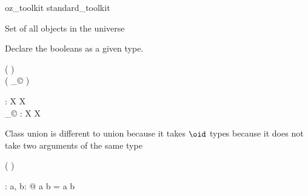 \begin{zsection}
  \SECTION oz\_toolkit \parents standard\_toolkit
\end{zsection}

Set of all objects in the universe

\begin{zed}
  [\oid]
\end{zed}

Declare the booleans as a given type.

\begin{zed}
  [\bool]
\end{zed}

\begin{zed}
  \function ( \poly \varg )\\
  \function ( \varg _{\copyright} )
\end{zed}

\begin{gendef}[X]
  \poly \varg : X \fun X\\
  \varg _{\copyright} : X \fun X
\end{gendef}

Class union is different to union because it takes $\oid$ types
because it does not take two arguments of the same type

\begin{zed}
   \leftassoc ( \varg \classuni \varg )
\end{zed}

\begin{axdef}
  \varg \classuni \varg : \power \oid \cross \power \oid \fun \power \oid
\where
  \forall a, b: \power \oid @ a \classuni b = a \cup b
\end{axdef}
